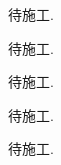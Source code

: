 \problem{}
\begin{solution}
    待施工.
\end{solution}


\problem{}
\begin{solution}
    待施工.
\end{solution}


\problem{}
\begin{solution}
    待施工.
\end{solution}



\problem{}
\begin{solution}
    待施工.
\end{solution}



\problem{}
\begin{solution}
    待施工.
\end{solution}



